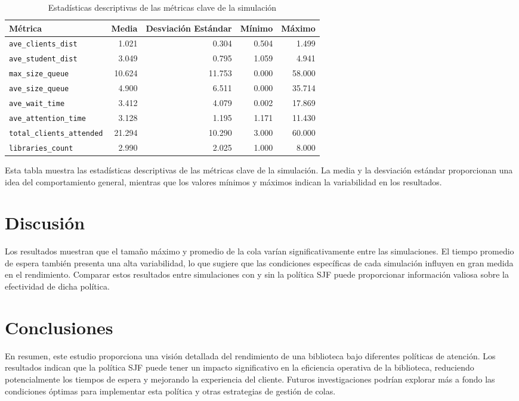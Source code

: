 \documentclass[10pt,twocolumn]{article}
\begin{document}
	\begin{table*}[h!]
		\centering
		\begin{tabular}{lrrrr}
			\hline
			\textbf{Métrica} & \textbf{Media} & \textbf{Desviación Estándar} & \textbf{Mínimo} & \textbf{Máximo} \\
			\hline
			\texttt{ave\_clients\_dist} & 1.021 & 0.304 & 0.504 & 1.499 \\
			\texttt{ave\_student\_dist} & 3.049 & 0.795 & 1.059 & 4.941 \\
			\texttt{max\_size\_queue} & 10.624 & 11.753 & 0.000 & 58.000 \\
			\texttt{ave\_size\_queue} & 4.900 & 6.511 & 0.000 & 35.714 \\
			\texttt{ave\_wait\_time} & 3.412 & 4.079 & 0.002 & 17.869 \\
			\texttt{ave\_attention\_time} & 3.128 & 1.195 & 1.171 & 11.430 \\
			\texttt{total\_clients\_attended} & 21.294 & 10.290 & 3.000 & 60.000 \\
			\texttt{libraries\_count} & 2.990 & 2.025 & 1.000 & 8.000 \\
			\hline
		\end{tabular}
		\caption{Estadísticas descriptivas de las métricas clave de la simulación}
		\label{tab:descriptive_stats}
	\end{table*}
	
	Esta tabla muestra las estadísticas descriptivas de las métricas clave de la simulación. La media y la desviación estándar proporcionan una idea del comportamiento general, mientras que los valores mínimos y máximos indican la variabilidad en los resultados.
	
	\section{Discusión}
	Los resultados muestran que el tamaño máximo y promedio de la cola varían significativamente entre las simulaciones. El tiempo promedio de espera también presenta una alta variabilidad, lo que sugiere que las condiciones específicas de cada simulación influyen en gran medida en el rendimiento. Comparar estos resultados entre simulaciones con y sin la política SJF puede proporcionar información valiosa sobre la efectividad de dicha política.
	
	\section{Conclusiones}
	En resumen, este estudio proporciona una visión detallada del rendimiento de una biblioteca bajo diferentes políticas de atención. Los resultados indican que la política SJF puede tener un impacto significativo en la eficiencia operativa de la biblioteca, reduciendo potencialmente los tiempos de espera y mejorando la experiencia del cliente. Futuros investigaciones podrían explorar más a fondo las condiciones óptimas para implementar esta política y otras estrategias de gestión de colas.
	
\end{document}
